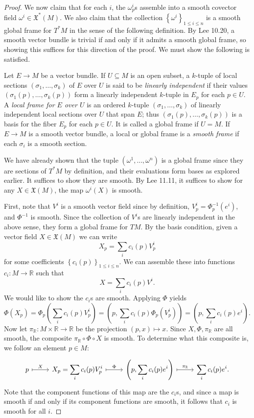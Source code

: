 \documentclass[11pt, letterpaper]{article}
\begin{document}
\begin{proof}
	We now claim that for each $i$, the $\omega ^i_p$s assemble into a smooth covector field $\omega ^i \in \mathfrak{X} ^*(M)$. We also claim that the collection $\left\{ \omega ^i \right\}_{1\leq i\leq n} $ is a smooth global frame for $T^*M$ in the sense of the following definition. By Lee 10.20, a smooth vector bundle is trivial if and only if it admits a smooth global frame, so showing this suffices for this direction of the proof. We must show the following is satisfied.
	\begin{definition}\label{kasndsjkn}
		Let $E\to M$ be a vector bundle. If $U\subseteq M$ is an open subset, a $k$-tuple of local sections $(\sigma _1, \ldots ,\sigma _k)$ of $E$ over $U$ is said to be \emph{linearly independent} if their values $(\sigma _1(p), \ldots ,\sigma _k(p))$ form a linearly independent $k$-tuple in $E_p$ for each $p\in U$. A \emph{local frame for $E$ over $U$} is an ordered $k$-tuple $(\sigma _1, \ldots ,\sigma _k)$ of linearly independent local sections over $U$ that span $E$; thus $(\sigma _1(p), \ldots ,\sigma _k(p))$ is a basis for the fiber $E_p$ for each $p\in U$. It is called a global frame if $U=M$. If $E\to M$ is a smooth vector bundle, a local or global frame is a \emph{smooth frame} if each $\sigma _i$ is a smooth section.
	\end{definition}
	We have already shown that the tuple $(\omega ^1, \ldots ,\omega ^n)$ is a global frame since they are sections of $T^*M$ by definition, and their evaluations form bases as explored earlier. It suffices to show they are smooth. By Lee 11.11, it suffices to show for any $X\in \mathfrak{X} (M)$, the map $\omega ^i(X)$ is smooth.

	First, note that $V^i$ is a smooth vector field since by definition, $V^i_p = \Phi ^{-1} _p(e^i)$, and $\Phi ^{-1} $ is smooth. Since the collection of $V^i$s are linearly independent in the above sense, they form a global frame for $TM$. By the basis condition, given a vector field $X\in \mathfrak{X} (M)$ we can write
	\[
		X_p = \sum_{i} c_i(p) V^i_p
	\]
	for some coefficients $\left\{ c_i(p) \right\}_{1\leq i\leq n} $. We can assemble these into functions $c_i : M \to \mathbb{R} $ such that
	\[
		X = \sum_{i} c_i(p)V^i
	.\]
	We would like to show the $c_i$s are smooth. Applying $\Phi $ yields
	\[
		\Phi (X_p)=\Phi _p\left( \sum_{i} c_i(p)V^i_p \right) =\left( p,\sum_{i} c_i(p)\Phi _p(V^i_p) \right) =\left( p,\sum_{i} c_i(p)e^i \right) 
	.\]
	Now let $\pi _\mathbb{R} : M\times \mathbb{R}  \to \mathbb{R} $ be the projection $(p,x)\mapsto x$. Since $X,\Phi ,\pi _\mathbb{R} $ are all smooth, the composite $\pi _\mathbb{R} \circ \Phi \circ X$ is smooth. To determine what this composite is, we follow an element $p\in M$:
	\[\begin{tikzcd}[row sep = 2.5em, column sep = 2.5em]
		p \ar[" X ", mapsto, r]  & \displaystyle{X_p=\sum_{i} c_i(p)V^i_p}\ar[" \Phi ", mapsto, r]  & \displaystyle{\left( p, \sum_{i} c_i(p)e^i \right) }\ar[" \pi _\mathbb{R}  ", mapsto, r]  & \displaystyle{\sum_{i} c_i(p)e^i}.
	\end{tikzcd}\]
	Note that the component functions of this map are the $c_i$s, and since a map is smooth if and only if its component functions are smooth, it follows that $c_i$ is smooth for all $i$.


\end{proof}
\end{document}
